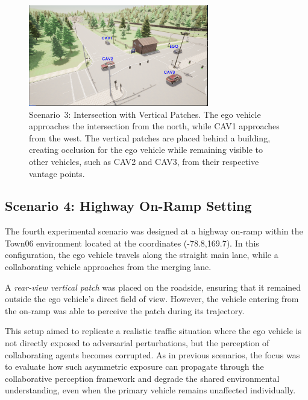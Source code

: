 \begin{figure}[H]
    \centering
    \includegraphics[width=0.7\textwidth]{figures/experiments/scenario3_v1.png}
    \caption{Scenario~3: Intersection with Vertical Patches. The ego vehicle approaches the intersection from the north, while CAV1 approaches from the west. The vertical patches are placed behind a building, creating occlusion for the ego vehicle while remaining visible to other vehicles, such as CAV2 and CAV3, from their respective vantage points.}
    \label{fig:scenario3_intersection}
\end{figure}

\subsection{Scenario 4: Highway On-Ramp Setting}
\label{subsec:scenario4}

The fourth experimental scenario was designed at a highway on-ramp within the 
Town06 environment located at the coordinates (-78.8,169.7). In this configuration, the ego vehicle travels along the 
straight main lane, while a collaborating vehicle approaches from the merging lane.  

A \textit{rear-view vertical patch} was placed on the roadside, ensuring that it remained 
outside the ego vehicle’s direct field of view. However, the vehicle entering 
from the on-ramp was able to perceive the patch during its trajectory.  

This setup aimed to replicate a realistic traffic situation where the ego 
vehicle is not directly exposed to adversarial perturbations, but the 
perception of collaborating agents becomes corrupted. As in previous 
scenarios, the focus was to evaluate how such asymmetric exposure can 
propagate through the collaborative perception framework and degrade the 
shared environmental understanding, even when the primary vehicle remains 
unaffected individually.  

